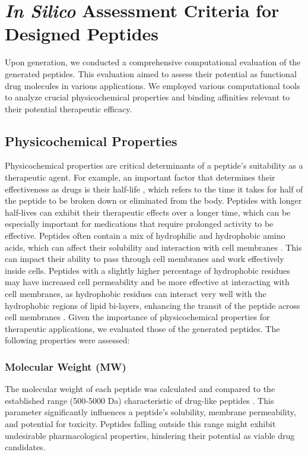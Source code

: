 \section{\textit{In Silico} Assessment Criteria for Designed Peptides}
Upon generation, we conducted a comprehensive computational evaluation of the generated peptides. This evaluation aimed to assess their potential as functional drug molecules in various applications. We employed various computational tools to analyze crucial physicochemical properties and binding affinities relevant to their potential therapeutic efficacy.

\subsection{Physicochemical Properties}
Physicochemical properties are critical determinants of a peptide's suitability as a therapeutic agent. For example, an important factor that determines their effectiveness as drugs is their half-life \cite{nugrahadi2023designing}, which refers to the time it takes for half of the peptide to be broken down or eliminated from the body. Peptides with longer half-lives can exhibit their therapeutic effects over a longer time, which can be especially important for medications that require prolonged activity to be effective. Peptides often contain a mix of hydrophilic and hydrophobic amino acids, which can affect their solubility and interaction with cell membranes \cite{madani2011mechanisms}. This can impact their ability to pass through cell membranes and work effectively inside cells. Peptides with a slightly higher percentage of hydrophobic residues may have increased cell permeability \cite{madani2011mechanisms} and be more effective at interacting with cell membranes, as hydrophobic residues can interact very well with the hydrophobic regions of lipid bi-layers, enhancing the transit of the peptide across cell membranes \cite{madani2011mechanisms}. Given the importance of physicochemical properties for therapeutic applications, we evaluated those of the generated peptides. The following properties were assessed:

\vspace{4pt} \noindent
\subsubsection{Molecular Weight (MW)}
The molecular weight of each peptide was calculated and compared to the established range (500-5000 Da) characteristic of drug-like peptides \cite{erckes2022story}. This parameter significantly influences a peptide's solubility, membrane permeability, and potential for toxicity. Peptides falling outside this range might exhibit undesirable pharmacological properties, hindering their potential as viable drug candidates.

